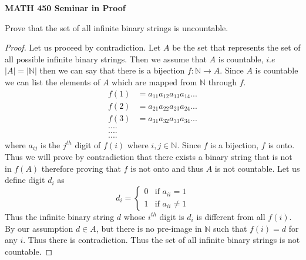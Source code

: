 \documentclass[14pt]{article}
\newcommand{\N}{\mathbb N}
\begin{document}
\begin{center}
		
{\bf MATH 450 Seminar in Proof}
 \\
\end{center}
	Prove that the set of all infinite binary strings is uncountable.
\begin{proof}
	Let us proceed by contradiction. Let $A$ be the set that represents the set of all possible infinite binary strings. Then we assume that $A$ is countable, $i.e$ $|A| = | \N |$ then we can say that there is a bijection $f: \N \rightarrow A$. Since $A$ is countable we can list the elements of $A$ which are mapped from $\N$ through $f$.
	\begin{align*}
	f(1) &= a_{11} a_{12}a_{13}a_{14}... \\
	f(2) &= a_{21}a_{22}a_{23}a_{24}... \\
	f(3) &= a_{31}a_{32}a_{33}a_{34}... \\
	....\\
	....\\
	.... 		
	\end{align*}
	where $a_{ij}$ is the $j^{th}$ digit of $f(i)$ where $i,j \in \N$. Since $f$ is a bijection, $f$ is onto. Thus we will prove by contradiction that there exists a binary string that is not in $f(A)$ therefore proving that $f$ is not onto and thus $A$ is not countable. Let us define digit $d_i$ as
	 \[
d_i =
\begin{cases}
 0 & \text{if } a_{ii} = 1 \\
 1 & \text{if } a_{ii} \neq 1
\end{cases}
\] 
Thus the infinite binary string $d$ whose $i^{th}$ digit is $d_i$ is different from all $f(i)$. By our assumption $d \in A$, but there is no pre-image in $\N$ such that $f(i) = d$ for any $i$. Thus there is contradiction. Thus the set of all infinite binary strings is not countable. 
\end{proof}
\end{document}
